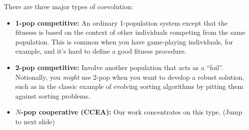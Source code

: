 \documentclass[compress,notes=hide]{beamer}
\begin{document}
{{{There are three major types of coevolution:
\begin{itemize}
	\item {\bf 1-pop competitive:} An ordinary 1-population system except that the fitnesss is based on the context of other individuals competing from the same population. This is common when you have game-playing individuals, for example, and it's hard to define a good fitness procedure.
	\item {\bf 2-pop competitive:} Involve another population that acts as a ``foil''. Notionally, you {\it might} use 2-pop when you want to develop a robust solution, such as in the classic example of evolving sorting algorithms by pitting them against sorting problems. 
	\item {\bf \(N\)-pop cooperative (CCEA):} Our work concentrates on this type. (Jump to next slide)
\end{itemize}
}
}

}

\end{document}
